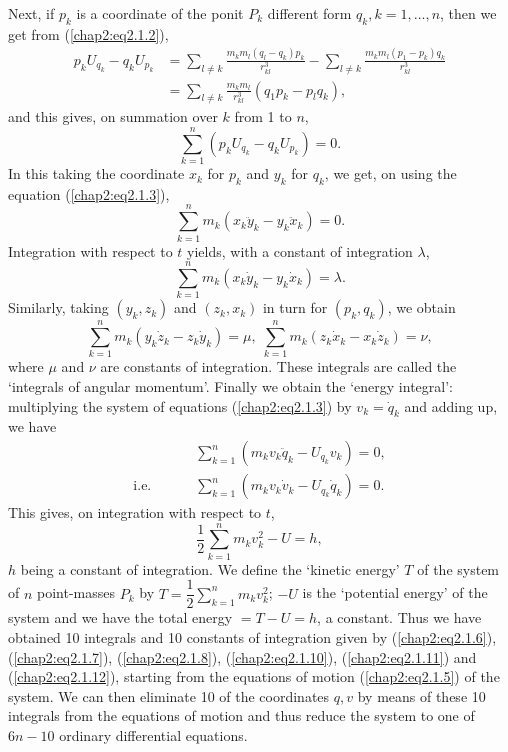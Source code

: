 Next, if $p_k$ is a coordinate of the ponit $P_k$ different form $q_k, k =1,\ldots,n$,  then we get from (\ref{chap2:eq2.1.2}),
\begin{align*}
p_k U_{q_k} - q_k U_{p_k} & = \sum\limits_{l\neq k} \frac{m_k m_l (q_l - q_k)p_k}{r^3_{kl}} - \sum_{l \neq k} \frac{m_k m_l(p_1 -p_k)q_k}{r^3_{kl}}\\
& = \sum\limits_{l \neq k} \frac{m_k m_l}{r^3_{kl}} (q_1 p_k - p_l q_k),
\end{align*}\pageoriginale
and this gives, on summation over $k$ from 1 to $n$, 
$$
\sum\limits^n_{k=1} (p_k U_{q_k} - q_k U_{p_k}) = 0.
$$
In this taking the coordinate $x_k$ for $p_k$ and $y_k$ for $q_k$, we get, on using the equation (\ref{chap2:eq2.1.3}),
$$
\sum\limits^n_{k=1} m_k (x_k \ddot{y}_k - y_k \ddot{x}_k) = 0. 
$$
Integration with respect to $t$ yields, with a constant of integration $\lambda$,
\begin{equation*}
\sum\limits^n_{k=1} m_k (x_k \dot{y}_k - y_k \dot{x}_k) = \lambda. \tag{2.1.10}\label{chap2:eq2.1.10} 
\end{equation*}
Similarly, taking $(y_k, z_k)$ and $(z_k, x_k)$ in turn for $(p_k, q_k)$, we obtain
\begin{equation*}
\sum\limits^n_{k=1} m_k (y_k \dot{z}_k - z_k\dot{y}_k ) = \mu, \; \sum\limits^n_{k=1} m_k (z_k \dot{x}_k - x_k \dot{z}_k) = \nu, \tag{2.1.11}\label{chap2:eq2.1.11} 
\end{equation*}
where $\mu$ and $\nu$ are constants of integration. These integrals are called the `integrals of angular momentum'. Finally we obtain the `energy integral': multiplying the system of equations (\ref{chap2:eq2.1.3}) by $v_k = \dot{q}_k$ and adding up, we have
\begin{align*}
& \sum\limits^n_{k=1} (m_k v_k \ddot{q}_k - U_{q_k} v_k) = 0,\\
\text{i.e. }  \qquad & \sum\limits^n_{k=1} (m_k v_k \dot{v}_k - U_{q_k} \dot{q}_k) = 0. 
\end{align*}\pageoriginale
This gives, on integration with respect to $t$,
\begin{equation*}
\frac{1}{2} \sum\limits^n_{k=1} m_k v^2_k - U = h, \tag{2.1.12}\label{chap2:eq2.1.12} 
\end{equation*}
$h$ being a constant of integration. We define the `kinetic energy' $T$ of the system of $n$ point-masses $P_k$ by $T = \dfrac{1}{2} \sum\limits^n_{k=1} m_k v^2_k$; $-U$ is the `potential energy' of the system and we have the total energy $= T- U = h$, a constant. Thus we have obtained 10 integrals and 10 constants of integration given by (\ref{chap2:eq2.1.6}), (\ref{chap2:eq2.1.7}), (\ref{chap2:eq2.1.8}), (\ref{chap2:eq2.1.10}), (\ref{chap2:eq2.1.11}) and (\ref{chap2:eq2.1.12}), starting from the equations of motion (\ref{chap2:eq2.1.5}) of the system. We can then eliminate 10 of the coordinates $q,v$ by means of these 10 integrals from the equations of motion and thus reduce the system to one of $6n - 10$ ordinary differential equations.

